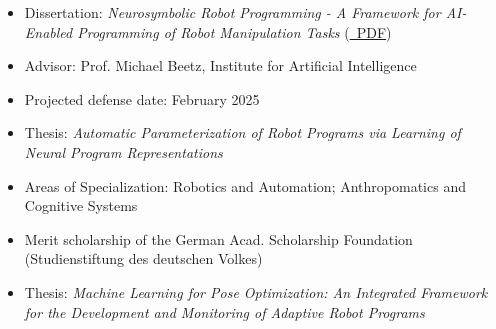 
\begin{itemize}
  \item Dissertation: \textit{Neurosymbolic Robot Programming - A Framework for AI-Enabled Programming of Robot Manipulation Tasks} (\href{https://nc.uni-bremen.de/index.php/s/soQcLeMCaY8XYgT}{\faLink ~PDF})
  \item Advisor: Prof. Michael Beetz, Institute for Artificial Intelligence
  \item Projected defense date: February 2025
\end{itemize}

\medskip

\begin{itemize}
  \item Thesis: \textit{Automatic Parameterization of Robot Programs via Learning of Neural Program Representations}
  \item Areas of Specialization: Robotics and Automation; Anthropomatics and Cognitive Systems
  \item Merit scholarship of the German Acad. Scholarship Foundation (Studienstiftung des deutschen Volkes)
\end{itemize}

\medskip

\begin{itemize}
  \item Thesis: \textit{Machine Learning for Pose Optimization: An Integrated Framework for the Development and Monitoring of Adaptive Robot Programs}
\end{itemize}




